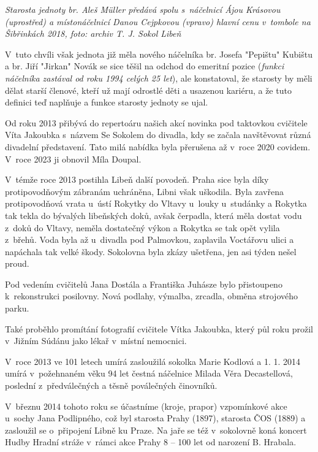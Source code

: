 \documentclass[a5paper, 12pt, twoside]{article}
\begin{document}

\textit{Starosta jednoty br. Aleš Müller předává spolu s~náčelnicí Ájou
Krásovou (uprostřed) a místonáčelnicí Danou Cejpkovou (vpravo) hlavní
cenu v~tombole na Šibřinkách 2018, foto: archiv T. J. Sokol Libeň}

V~tuto chvíli však jednota již měla nového náčelníka br. Josefa
"Pepištu" Kubištu a br. Jiří "Jirkan" Novák se sice těšil na odchod do
emeritní pozice (\textit{funkci náčelníka zastával od roku 1994 celých 25
let}), ale konstatoval, že starosty by měli dělat starší členové, kteří
už mají odrostlé děti a usazenou kariéru, a že tuto definici teď
naplňuje a funkce starosty jednoty se ujal.

Od roku 2013 přibývá do repertoáru našich akcí novinka pod taktovkou
cvičitele Víta Jakoubka s~názvem Se Sokolem do divadla, kdy se začala
navštěvovat různá divadelní představení. Tato milá nabídka byla
přerušena až v~roce 2020 covidem. V~roce 2023 ji obnovil Míla Doupal.

V~témže roce 2013 postihla Libeň další povodeň. Praha sice byla díky
protipovodňovým zábranám uchráněna, Libni však uškodila. Byla zavřena
protipovodňová vrata u~ústí Rokytky do Vltavy u~louky u~studánky a
Rokytka tak tekla do bývalých libeňských doků, avšak čerpadla, která
měla dostat vodu z~doků do Vltavy, neměla dostatečný výkon a Rokytka se
tak opět vylila z~břehů. Voda byla až u~divadla pod Palmovkou, zaplavila
Voctářovu ulici a napáchala tak velké škody. Sokolovna byla zkázy
ušetřena, jen asi týden nešel proud.

Pod vedením cvičitelů Jana Dostála a Františka Juhásze bylo přistoupeno
k~rekonstrukci posilovny. Nová podlahy, výmalba, zrcadla, obměna
strojového parku.

Také proběhlo promítání fotografií cvičitele Vítka Jakoubka, který půl
roku prožil v~Jižním Súdánu jako lékař v~místní nemocnici.

V~roce 2013 ve 101 letech umírá zasloužilá sokolka Marie Kodlová a 1. 1.
2014 umírá v~požehnaném věku 94 let čestná náčelnice Milada Věra
Decastellová, poslední z~předválečných a těsně poválečných činovníků.

V~březnu 2014 tohoto roku se účastníme (kroje, prapor) vzpomínkové akce
u~sochy Jana Podlipného, což byl starosta Prahy (1897), starosta ČOS
(1889) a zasloužil se o~připojení Libně ku Praze. Na jaře se též
v~sokolovně koná koncert Hudby Hradní stráže v~rámci akce Prahy 8 -- 100
let od narození B. Hrabala.
\end{document}
